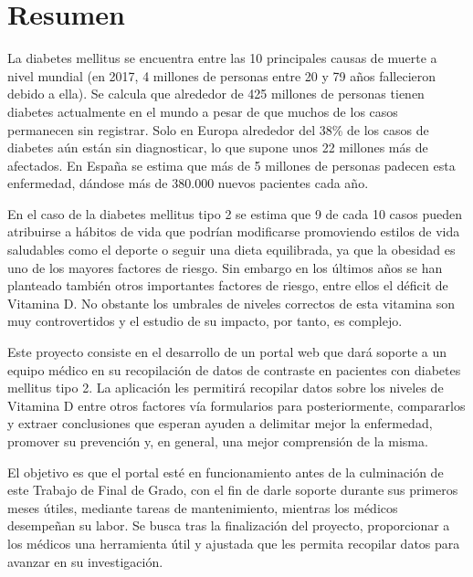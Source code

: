 \chapter*{Resumen}

   La diabetes mellitus se encuentra entre las 10 principales causas de muerte a nivel mundial (en 2017, 4 millones de personas entre 20 y 79 años fallecieron debido a ella). Se calcula que alrededor de 425 millones de personas tienen diabetes actualmente en el mundo a pesar de que muchos de los casos permanecen sin registrar. Solo en Europa alrededor del 38\% de los casos de diabetes aún están sin diagnosticar, lo que supone unos 22 millones más de afectados. En España se estima que más de 5 millones de personas padecen esta enfermedad, dándose más de 380.000 nuevos pacientes cada año.  \newline
   
	En el caso de la diabetes mellitus tipo 2 se estima que 9 de cada 10 casos pueden atribuirse a hábitos de vida que podrían modificarse promoviendo estilos de vida saludables como el deporte o seguir una dieta equilibrada, ya que la obesidad es uno de los mayores factores de riesgo. Sin embargo en los últimos años se han planteado también otros importantes factores de riesgo, entre ellos el déficit de Vitamina D. No obstante los umbrales de niveles correctos de esta vitamina son muy controvertidos y el estudio de su impacto, por tanto, es complejo. \newline

    Este proyecto consiste en el desarrollo de un portal web que dará soporte a un equipo médico en su recopilación de datos de contraste en pacientes con diabetes mellitus tipo 2. La aplicación les permitirá recopilar datos sobre los niveles de Vitamina D entre otros factores vía formularios para posteriormente, compararlos y extraer conclusiones que esperan ayuden a delimitar mejor la enfermedad, promover su prevención y, en general, una mejor comprensión de la misma. \newline

    El objetivo es que el portal esté en funcionamiento antes de la culminación de este Trabajo de Final de Grado, con el fin de darle soporte durante sus primeros meses útiles, mediante tareas de mantenimiento, mientras los médicos desempeñan su labor. Se busca tras la finalización del proyecto, proporcionar a los médicos una herramienta útil y ajustada que les permita recopilar datos para avanzar en su investigación.
